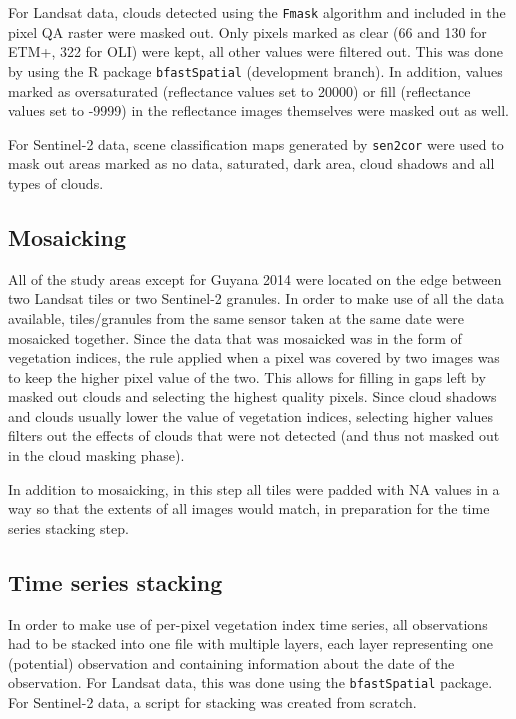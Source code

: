 \documentclass[a4paper,12pt]{scrbook}
\begin{document}
For Landsat data, clouds detected using the \texttt{Fmask} algorithm \citep{zhu_object-based_2012} and included in the pixel QA raster were masked out. Only pixels marked as clear (66 and 130 for \ac{ETM+}, 322 for \ac{OLI}) were kept, all other values were filtered out. This was done by using the R package \texttt{bfastSpatial} (development branch). In addition, values marked as oversaturated (reflectance values set to 20000) or fill (reflectance values set to -9999) in the reflectance images themselves were masked out as well.

For Sentinel-2 data, scene classification maps generated by \texttt{sen2cor} were used to mask out areas marked as no data, saturated, dark area, cloud shadows and all types of clouds.

\subsection{Mosaicking}

All of the study areas except for Guyana 2014 were located on the edge between two Landsat tiles or two Sentinel-2 granules. In order to make use of all the data available, tiles/granules from the same sensor taken at the same date were mosaicked together. Since the data that was mosaicked was in the form of vegetation indices, the rule applied when a pixel was covered by two images was to keep the higher pixel value of the two. This allows for filling in gaps left by masked out clouds and selecting the highest quality pixels. Since cloud shadows and clouds usually lower the value of vegetation indices, selecting higher values filters out the effects of clouds that were not detected (and thus not masked out in the cloud masking phase).

In addition to mosaicking, in this step all tiles were padded with \ac{NA} values in a way so that the extents of all images would match, in preparation for the time series stacking step.

\subsection{Time series stacking}

In order to make use of per-pixel vegetation index time series, all observations had to be stacked into one file with multiple layers, each layer representing one (potential) observation and containing information about the date of the observation. For Landsat data, this was done using the \texttt{bfastSpatial} package. For Sentinel-2 data, a script for stacking was created from scratch.
\end{document}
